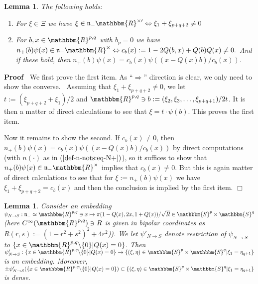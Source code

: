 \documentclass{article}
\newcommand{\assign}{:=}
\renewenvironment{proof}{\noindent\textbf{Proof\ }}{\hspace*{\fill}$\Box$\medskip}
\newtheorem{lemma}[proposition]{Lemma}
\theoremstyle{remark}
\begin{document}
\begin{lemma}
  \label{k-finite:lem-compat-N-aux}The following holds:
  \begin{enumerate}
    \item For $\xi \in \Xi$ we have $\xi \in \mathfrak{n}_-
    \mathbbm{R}^{\times \prime} \Leftrightarrow \xi_1 + \xi_{p + q + 2} \neq
    0$
    
    \item For $b, x \in \mathbbm{R}^{p, q}$ with $b_p = 0$ we have $n_+ (b)
    \psi (x) \in \mathfrak{n}_- \mathbbm{R}^{\times} \Leftrightarrow c_b (x)
    \assign 1 - 2 Q (b, x) + Q (b) Q (x) \neq 0.$ And if these hold, then $n_+
    (b) \psi (x) = c_b (x) \psi ((x - Q (x) b) / c_b (x))$.
  \end{enumerate}
\end{lemma}

\begin{proof}
  We first prove the first item. As ``$\Rightarrow$'' direction is clear, we
  only need to show the converse. \ Assuming that $\xi_1 + \xi_{p + q + 2}
  \neq 0$, we let $t \assign (\xi_{p + q + 2} + \xi_1) / 2$ and
  $\mathbbm{R}^{p, q} \ni b \assign (\xi_2, \xi_3, \ldots, \xi_{p + q + 1}) /
  2 t$. It is then a matter of direct calculations to see that $\xi = t \cdot
  \psi (b)$. This proves the first item.
  
  Now it remains to show the second. If $c_b (x) \neq 0$, then $n_+ (b) \psi
  (x) = c_b (x) \psi ((x - Q (x) b) / c_b (x))$ by direct computations (with
  $n (\cdot)$ as in $(\ref{def-n-nots:eq-N+})$), so it suffices to show that
  $n_+ (b) \psi (x) \in \mathfrak{n}_- \mathbbm{R}^{\times}$ implies that $c_b
  (x) \neq 0$. But this is again matter of direct calculations to see that for
  $\xi \assign n_+ (b) \psi (x)$ we have $\xi_1 + \xi_{p + q + 2} = c_b (x)$
  and then the conclusion is implied by the first item.
\end{proof}

\begin{lemma}
  \label{k-finite:lem-restr-opendense}Consider an embedding $\psi_{N
  \rightarrow S} : \mathfrak{n}_- \simeq \mathbbm{R}^{p, q} \ni x \mapsto \pi
  (1 - Q (x), 2 x, 1 + Q (x)) / \sqrt{R} \in \mathbbm{S}^p \times
  \mathbbm{S}^q$ (here $C^{\infty} (\mathbbm{R}^{p, q}) \ni R$ is given in
  bipolar coordinates as $R (r, s) \assign (1 - r^2 + s^2)^2 + 4 r^2$)). We
  let $\psi'_{N \rightarrow S}$ denote restriction of $\psi_{N \rightarrow S}$
  to $\{ x \in \mathbbm{R}^{p, q} \backslash \{ 0 \} | Q (x) = 0 \}$. Then
  $\psi'_{N \rightarrow S} : \{ x \in \mathbbm{R}^{p, q} \backslash \{ 0 \} |
  Q (x) = 0 \} \rightarrow \{ (\xi, \eta) \in \mathbbm{S}^p \times
  \mathbbm{S}^q | \xi_1 = \eta_{q + 1} \}$ is an embedding. Moreover, $\pm
  \psi'_{N \rightarrow S} (\{ x \in \mathbbm{R}^{p, q} \backslash \{ 0 \} | Q
  (x) = 0 \}) \subset \{ (\xi, \eta) \in \mathbbm{S}^p \times \mathbbm{S}^q |
  \xi_1 = \eta_{q + 1} \}$ is dense.
\end{lemma}
\end{document}
